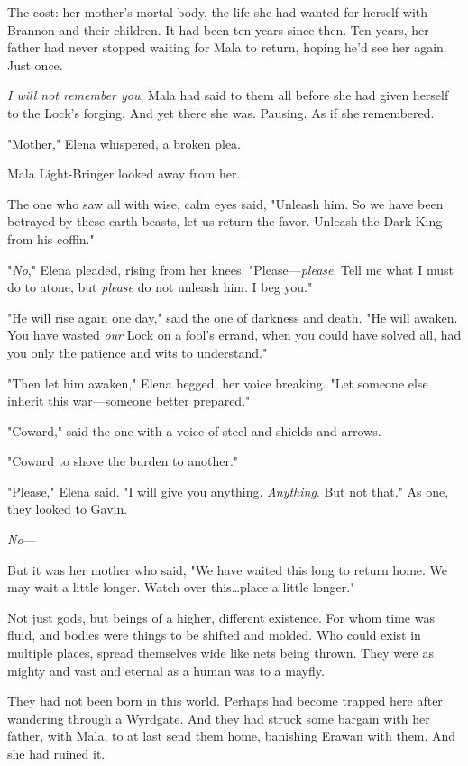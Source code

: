 The cost: her mother's mortal body, the life she had wanted for herself with Brannon and their children.
It had been ten years since then.
Ten years, her father had never stopped waiting for Mala to return, hoping he'd see her again.
Just once.

\emph{I will not remember you}, Mala had said to them all before she had given herself to the Lock's forging.
And yet there she was.
Pausing.
As if she remembered.

"Mother," Elena whispered, a broken plea.

Mala Light-Bringer looked away from her.

The one who saw all with wise, calm eyes said, "Unleash him.
So we have been betrayed by these earth beasts, let us return the favor.
Unleash the Dark King from his coffin."

"\emph{No}," Elena pleaded, rising from her knees.
"Please---\emph{please}.
Tell me what I must do to atone, but \emph{please} do not unleash him.
I beg you."

"He will rise again one day," said the one of darkness and death.
"He will awaken.
You have wasted \emph{our} Lock on a fool's errand, when you could have solved all, had you only the patience and wits to understand."

"Then let him awaken," Elena begged, her voice breaking.
"Let someone else inherit this war---someone better prepared."

"Coward," said the one with a voice of steel and shields and arrows.

"Coward to shove the burden to another."

"Please," Elena said.
"I will give you anything.
\emph{Anything}.
But not that."
As one, they looked to Gavin.

\emph{No}---

But it was her mother who said, "We have waited this long to return home.
We may wait a little longer.
Watch over this\ldots place a little longer."

Not just gods, but beings of a higher, different existence.
For whom time was fluid, and bodies were things to be shifted and molded.
Who could exist in multiple places, spread themselves wide like nets being thrown.
They were as mighty and vast and eternal as a human was to a mayfly.

They had not been born in this world.
Perhaps had become trapped here after wandering through a Wyrdgate.
And they had struck some bargain with her father, with Mala, to at last send them home, banishing Erawan with them.
And she had ruined it.

